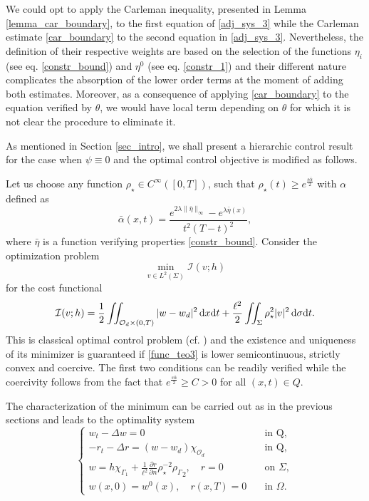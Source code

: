 \documentclass{dcds-bOF}
\theoremstyle{definition}
\newcommand\csin[1]{\chi_{#1}}
\def\csbd{\rho_{\Gamma}}
\def\dx{\,\textnormal{d}x}
\def\dt{\textnormal{d}t}
\def\d{\,\textnormal{d}}
\begin{document}
We could opt to apply the Carleman inequality, presented in Lemma \ref{lemma_car_boundary}, to the first equation of \eqref{adj_sys_3} while the Carleman estimate \eqref{car_boundary} to the second equation in \eqref{adj_sys_3}. Nevertheless, the definition of their respective weights are based on the selection of the functions $\eta_i$ (see eq. \eqref{constr_bound}) and $\eta^0$ (see eq. \eqref{constr_1}) and their different nature complicates the absorption of the lower order terms at the moment of adding both estimates. Moreover, as a consequence of applying \eqref{car_boundary} to the equation verified by $\theta$, we would have local term depending on $\theta$ for which it is not clear the procedure to eliminate it.

As mentioned in Section \ref{sec_intro}, we shall present a hierarchic control result for the case when $\psi\equiv 0$ and the optimal control objective is modified as follows.

Let us choose any function $\rho_\star\in C^\infty([0,T])$, such that $\rho_\star(t)\geq e^{\frac{s\bar\alpha}{2}}$ with $\alpha$ defined as
%
\begin{equation*}
\bar\alpha(x,t)=\frac{e^{2\lambda\|\bar\eta\|_{\infty}}-e^{\lambda\bar\eta(x)}}{t^2(T-t)^2},
\end{equation*}
%
where $\bar\eta$ is a function verifying properties \eqref{constr_bound}.
%
%
Consider the optimization problem
%
\begin{equation*}
\min_{v\in L^2(\Sigma)} \mathcal I(v;h)
\end{equation*}
%
for the cost functional
%
\begin{equation*}%
\mathcal I(v;h)=\frac{1}{2}\iint_{\mathcal O_d\times(0,T)}|w-w_d|^2\dx\dt+\frac{\ell^2}{2}\iint_{\Sigma}\rho_\star^2|v|^2\d\sigma\dt.
\end{equation*}
%
This is classical optimal control problem (cf. \cite{Lions_optim}) and the existence and uniqueness of its minimizer is  guaranteed if \eqref{func_teo3} is lower semicontinuous, strictly convex and coercive. The first two conditions can be readily verified while the coercivity follows from the fact that $e^{\frac{s\bar\alpha}{2}}\geq C>0$ for all $(x,t)\in Q$.

The characterization of the minimum can be carried out as in the previous sections and leads to the optimality system
%
\begin{equation*}%
\begin{cases}
w_t-\Delta w=0 &\quad  \text{in Q}, \\
-r_t-\Delta r= (w-w_d)\chi_{\mathcal O_d}  &\quad  \text{in Q},\\
w=h\csin{\Gamma_1}+ \frac{1}{\ell^2}\frac{\partial r}{\partial n}\rho_\star^{-2}{\csbd}_2, \quad r=0 &\quad \text{on } \Sigma, \\
w(x,0)=w^0(x),\quad r(x,T)=0 &\quad \text{in } \Omega.
\end{cases}
\end{equation*}
\end{document}
